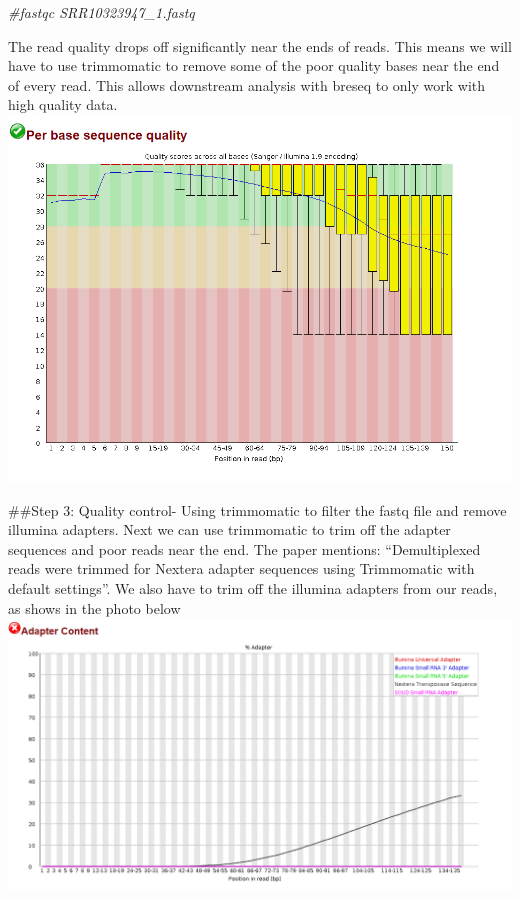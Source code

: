 \documentclass[
]{article}
\newenvironment{Shaded}{\begin{snugshade}}{\end{snugshade}}
\newcommand{\CommentTok}[1]{\textcolor[rgb]{0.56,0.35,0.01}{\textit{#1}}}
\begin{document}
\begin{Shaded}
\begin{Highlighting}[]
\CommentTok{#fastqc SRR10323947_1.fastq}
\end{Highlighting}
\end{Shaded}

The read quality drops off significantly near the ends of reads. This
means we will have to use trimmomatic to remove some of the poor quality
bases near the end of every read. This allows downstream analysis with
breseq to only work with high quality data.
\includegraphics{fastqc_example.png}

\#\#Step 3: Quality control- Using trimmomatic to filter the fastq file
and remove illumina adapters. Next we can use trimmomatic to trim off
the adapter sequences and poor reads near the end. The paper mentions:
``Demultiplexed reads were trimmed for Nextera adapter sequences using
Trimmomatic with default settings''. We also have to trim off the
illumina adapters from our reads, as shows in the photo below
\includegraphics{fastqc_adapters_to_trim.png}
\end{document}
